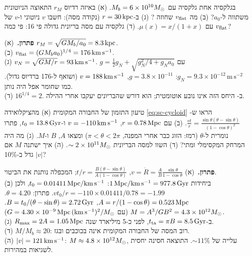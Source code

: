 \begin{exercise}{ בגלקסיה אחת}
גלקסיה עם $M_b=6\times10^{10}M_{\odot}$. (א) באיזה רדיוס $r_M$ התאוצה הניוטונית משתווה ל-$a_0$? (ב) מה $v_{\rm flat}$ שחוזה ? (ג) ב-$r=30\,\mathrm{kpc}$ (נקודה מסה): חשבו $v$ ניוטוני ו-$v$ של  עם $\mu(x)=x/(1+x)$. (ד) גלקסיה עם מסה בריונית גדולה פי 16: פי כמה $v_{\rm flat}$?
\end{exercise}
\begin{solbox}
\textbf{פתרון.}\ (א) $r_M=\sqrt{GM_b/a_0}=8.3\,\mathrm{kpc}$.\\
(ב) $v_{\rm flat}=(GM_ba_0)^{1/4}=176\,\mathrm{km\,s^{-1}}$.\\
(ג) $v_N=\sqrt{GM/r}=93\,\mathrm{km\,s^{-1}}$. $g=\tfrac12g_N+\sqrt{g_N^2/4+g_Na_0}$ עם $g_N=9.3\times10^{-12}\,\mathrm{m\,s^{-2}}$: $g=3.8\times10^{-11}$, $v=188\,\mathrm{km\,s^{-1}}$ (ושואף ל-176 ברדיוס גדול). כמו שחומר אפל היה נותן.\\
(ד) $16^{1/4}=2$. ב- היחס הזה אינו נובע אוטומטית; הוא דורש שהבריונים יעקבו אחרי ההילה.
\end{solbox}

\begin{exercise}{טיעון התזמון של החבורה המקומית}
(א) מהציקלואידה \eqref{eq:sc-cycloid} הראו ש-$\frac{vt}{r}=\frac{\sin\theta(\theta-\sin\theta)}{(1-\cos\theta)^2}$. (ב) עם $r=0.78\,\mathrm{Mpc}$, $v=-110\,\mathrm{km\,s^{-1}}$ ו-$t_0=13.8\,\mathrm{Gyr}$, פתרו נומרית ל-$\theta$ (רמז: הזוג כבר אחרי המפנה, $\pi<\theta<2\pi$) ומצאו $A$, $B$ ו-$M$. (ג) מה היה המרחק המקסימלי ומתי? (ד) השוו למסה הבריונית $\sim2\times10^{11}M_{\odot}$. (ה) איך ישתנה $M$ אם $|v|$ גדל ב-10\%?
\end{exercise}
\begin{solbox}
\textbf{פתרון.}\ (א) $v=\dot R=\frac AB\frac{\sin\theta}{1-\cos\theta}$, $t/r=\frac{B(\theta-\sin\theta)}{A(1-\cos\theta)}$; המכפלה נותנת את הביטוי.\\
(ב) ביחידות $1\,\mathrm{Mpc}/\mathrm{km\,s^{-1}}=977.8\,\mathrm{Gyr}$: $t_0=0.01411\,\mathrm{Mpc}/\mathrm{km\,s^{-1}}$, ולכן $vt_0/r=-110\times0.01411/0.78=-1.99$. פתרון: $\theta=4.20$. $A=r/(1-\cos\theta)=0.523\,\mathrm{Mpc}$, $B=t_0/(\theta-\sin\theta)=2.72\,\mathrm{Gyr}$. $M=A^3/GB^2=4.3\times10^{12}M_{\odot}$ (עם $G=4.30\times10^{-9}\,\mathrm{Mpc}\,(\mathrm{km\,s^{-1}})^2/M_{\odot}$).\\
(ג) $R_{\max}=2A=1.05\,\mathrm{Mpc}$ ב-$t_{\rm ta}=\pi B=8.5\,\mathrm{Gyr}$, לפני כ-5 מיליארד שנה.\\
(ד) $M/M_b\approx20$: רוב המסה של החבורה המקומית אינה בכוכבים ובגז.\\
(ה) $|v|=121\,\mathrm{km\,s^{-1}}$: $M\approx4.8\times10^{12}M_{\odot}$, עלייה של $\sim11\%$. התוצאה חסינה יחסית לשגיאות במהירות.
\end{solbox}
